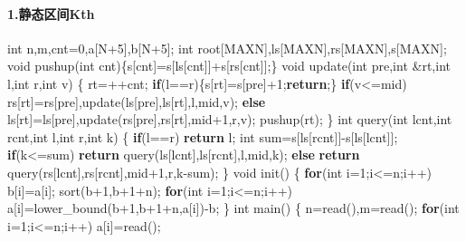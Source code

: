 \documentclass[
]{article}
\newenvironment{Shaded}{}{}
\newcommand{\ControlFlowTok}[1]{\textcolor[rgb]{0.00,0.44,0.13}{\textbf{#1}}}
\newcommand{\DataTypeTok}[1]{\textcolor[rgb]{0.56,0.13,0.00}{#1}}
\newcommand{\DecValTok}[1]{\textcolor[rgb]{0.25,0.63,0.44}{#1}}
\newcommand{\NormalTok}[1]{#1}
\begin{document}
\hypertarget{ux9759ux6001ux533aux95f4kth}{%
\paragraph{1.静态区间Kth}\label{ux9759ux6001ux533aux95f4kth}}

\begin{Shaded}
\begin{Highlighting}[]
\DataTypeTok{int}\NormalTok{ n,m,cnt=}\DecValTok{0}\NormalTok{,a[N+}\DecValTok{5}\NormalTok{],b[N+}\DecValTok{5}\NormalTok{];}
\DataTypeTok{int}\NormalTok{ root[MAXN],ls[MAXN],rs[MAXN],s[MAXN];}
\DataTypeTok{void}\NormalTok{ pushup(}\DataTypeTok{int}\NormalTok{ cnt)\{s[cnt]=s[ls[cnt]]+s[rs[cnt]];\}}
\DataTypeTok{void}\NormalTok{ update(}\DataTypeTok{int}\NormalTok{ pre,}\DataTypeTok{int}\NormalTok{ \&rt,}\DataTypeTok{int}\NormalTok{ l,}\DataTypeTok{int}\NormalTok{ r,}\DataTypeTok{int}\NormalTok{ v)}
\NormalTok{\{}
\NormalTok{    rt=++cnt;}
    \ControlFlowTok{if}\NormalTok{(l==r)\{s[rt]=s[pre]+}\DecValTok{1}\NormalTok{;}\ControlFlowTok{return}\NormalTok{;\}}
    \ControlFlowTok{if}\NormalTok{(v\textless{}=mid) rs[rt]=rs[pre],update(ls[pre],ls[rt],l,mid,v);}
    \ControlFlowTok{else}\NormalTok{ ls[rt]=ls[pre],update(rs[pre],rs[rt],mid+}\DecValTok{1}\NormalTok{,r,v);}
\NormalTok{    pushup(rt);}
\NormalTok{\}}
\DataTypeTok{int}\NormalTok{ query(}\DataTypeTok{int}\NormalTok{ lcnt,}\DataTypeTok{int}\NormalTok{ rcnt,}\DataTypeTok{int}\NormalTok{ l,}\DataTypeTok{int}\NormalTok{ r,}\DataTypeTok{int}\NormalTok{ k)}
\NormalTok{\{}
    \ControlFlowTok{if}\NormalTok{(l==r) }\ControlFlowTok{return}\NormalTok{ l;}
    \DataTypeTok{int}\NormalTok{ sum=s[ls[rcnt]]{-}s[ls[lcnt]];}
    \ControlFlowTok{if}\NormalTok{(k\textless{}=sum) }\ControlFlowTok{return}\NormalTok{ query(ls[lcnt],ls[rcnt],l,mid,k);}
    \ControlFlowTok{else} \ControlFlowTok{return}\NormalTok{ query(rs[lcnt],rs[rcnt],mid+}\DecValTok{1}\NormalTok{,r,k{-}sum);}
\NormalTok{\}}
\DataTypeTok{void}\NormalTok{ init()}
\NormalTok{\{}
    \ControlFlowTok{for}\NormalTok{(}\DataTypeTok{int}\NormalTok{ i=}\DecValTok{1}\NormalTok{;i\textless{}=n;i++) b[i]=a[i];}
\NormalTok{    sort(b+}\DecValTok{1}\NormalTok{,b+}\DecValTok{1}\NormalTok{+n);}
    \ControlFlowTok{for}\NormalTok{(}\DataTypeTok{int}\NormalTok{ i=}\DecValTok{1}\NormalTok{;i\textless{}=n;i++) a[i]=lower\_bound(b+}\DecValTok{1}\NormalTok{,b+}\DecValTok{1}\NormalTok{+n,a[i]){-}b;}
\NormalTok{\}}
\DataTypeTok{int}\NormalTok{ main()}
\NormalTok{\{}
\NormalTok{    n=read(),m=read();}
    \ControlFlowTok{for}\NormalTok{(}\DataTypeTok{int}\NormalTok{ i=}\DecValTok{1}\NormalTok{;i\textless{}=n;i++) a[i]=read();}

\end{Highlighting}
\end{Shaded}
\end{document}
